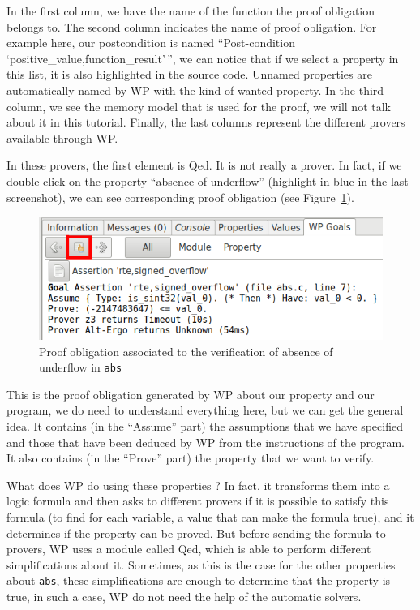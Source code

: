 \documentclass[12pt,francais,]{scrbook}
\begin{document}
In the first column, we have the name of the function the proof
obligation belongs to. The second column indicates the name of proof
obligation. For example here, our postcondition is named
``Post-condition `positive\_value,function\_result'\,'', we can notice
that if we select a property in this list, it is also highlighted in the
source code. Unnamed properties are automatically named by WP with the
kind of wanted property. In the third column, we see the memory model
that is used for the proof, we will not talk about it in this tutorial.
Finally, the last columns represent the different provers available
through WP.

In these provers, the first element is Qed. It is not really a prover.
In fact, if we double-click on the property ``absence of underflow''
(highlight in blue in the last screenshot), we can see corresponding
proof obligation (see Figure~\ref{fig:2-1-1-abs-6}).

\begin{figure}[htbp]
\centering
\includegraphics[scale=0.5]{2-1-1-abs-6.png}
\caption{Proof obligation associated to the verification of absence of
  underflow in \texttt{abs}}
\label{fig:2-1-1-abs-6}
\end{figure}

This is the proof obligation generated by WP about our property and our
program, we do need to understand everything here, but we can get the
general idea. It contains (in the ``Assume'' part) the assumptions that
we have specified and those that have been deduced by WP from the
instructions of the program. It also contains (in the ``Prove'' part)
the property that we want to verify.

What does WP do using these properties ? In fact, it transforms them
into a logic formula and then asks to different provers if it is
possible to satisfy this formula (to find for each variable, a value
that can make the formula true), and it determines if the property can
be proved. But before sending the formula to provers, WP uses a module
called Qed, which is able to perform different simplifications about it.
Sometimes, as this is the case for the other properties about
\texttt{abs}, these simplifications are enough to determine that the
property is true, in such a case, WP do not need the help of the
automatic solvers.
\end{document}
